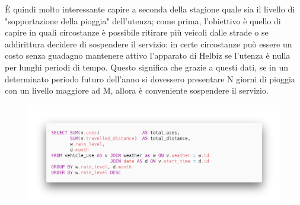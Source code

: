 È quindi molto interessante capire a seconda della stagione quale
sia il livello di "sopportazione della pioggia" dell'utenza; come prima,
l'obiettivo è quello di capire in quali circostanze è possibile ritirare
più veicoli dalle strade o se addirittura decidere di sospendere il servizio: in
certe circostanze può essere un costo senza guadagno mantenere attivo l'apparato
di Helbiz se l'utenza è nulla per lunghi periodi di tempo.
Questo significa che grazie a questi dati, se in un determinato periodo futuro
dell'anno si dovessero presentare N giorni di pioggia con un livello maggiore ad M,
allora è conveniente sospendere il servizio.
\begin{figure}[H]                                                                                                                                                            
\centering                                                                                                                                                                   
\includegraphics[width=\textwidth]{images/query2}                                                                                                                                   
\label{fig:query2}                                                                                                                                                           
\end{figure}

